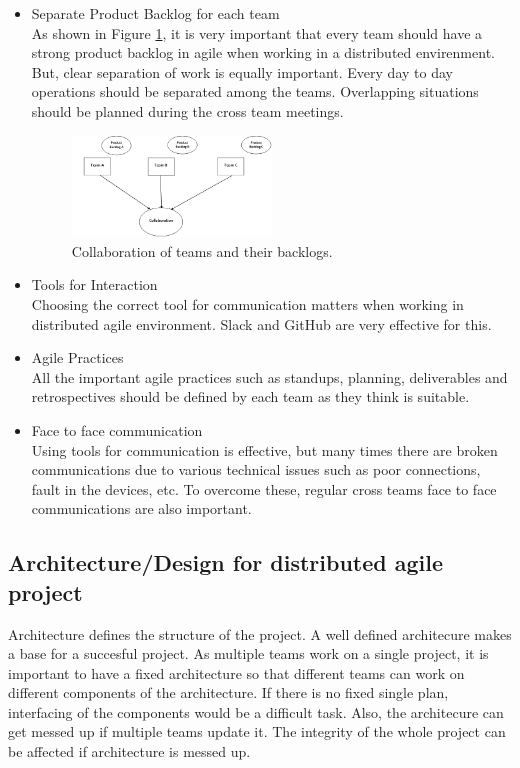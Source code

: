 \documentclass[sigconf]{acmart}
\begin{document}
\begin{itemize}
\item Separate Product Backlog for each team
\\As shown in Figure \ref{fig:PBCollab}, it is very important that every team should have a strong product backlog in agile when working in a distributed envirenment. But, clear separation of work is equally important. Every day to day operations should be separated among the teams. Overlapping situations should be planned during the cross team meetings.

\begin{figure}[H]
  \includegraphics[width=0.5\textwidth]{PBCollab}
  \caption{Collaboration of teams and their backlogs.}
  \label{fig:PBCollab}
\end{figure}

\item Tools for Interaction
\\Choosing the correct tool for communication matters when working in distributed agile environment. Slack and GitHub are very effective for this.

\item Agile Practices
\\All the important agile practices such as standups, planning, deliverables and retrospectives should be defined by each team as they think is suitable.

\item Face to face communication 
\\Using tools for communication is effective, but many times there are broken communications due to various technical issues such as poor connections, fault in the devices, etc. To overcome these, regular cross teams face to face communications are also important.
\end{itemize}

\subsection{Architecture/Design for distributed agile project}
Architecture defines the structure of the project. A well defined architecure makes a base for a succesful project. As multiple teams work on a single project, it is important to have a fixed architecture so that different teams can work on different components of the architecture. If there is no fixed single plan, interfacing of the components would be a difficult task. Also, the architecure can get messed up if multiple teams update it. The integrity of the whole project can be affected if architecture is messed up.
\end{document}
